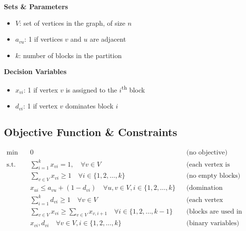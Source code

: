 \vspace{4mm}
\begin{minipage}[t]{0.48\textwidth}
\textbf{Sets \& Parameters}
\begin{itemize}[label=, noitemsep, topsep=0pt, leftmargin=2mm]
    \item $V$: set of vertices in the graph, of size $n$
    \item $a_{vu}$: 1 if vertices $v$ and $u$ are adjacent
    \item $k$: number of blocks in the partition
\end{itemize}
\end{minipage}
\hfill
\begin{minipage}[t]{0.48\textwidth}
\textbf{Decision Variables}
\begin{itemize}[label=, noitemsep, topsep=0pt, leftmargin=2mm]
    \item $x_{vi}$: 1 if vertex $v$ is assigned to the $i$\textsuperscript{th} block
    \item $d_{vi}$: 1 if vertex $v$ dominates block $i$
\end{itemize}
\end{minipage}

\subsection*{Objective Function \& Constraints}
\begin{align*}
    \min \quad &0 &&\text{(no objective)}\\
    \text{s.t.} \quad
    &\sum_{i=1}^{k} x_{vi} = 1, \quad \forall v \in V &&\text{(each vertex is assigned to one block)}\\
    &\sum_{v \in V} x_{vi} \geq 1 \quad \forall i \in \{1, 2, \dots, k\} &&\text{(no empty blocks)}\\
    &x_{ui} \leq a_{vu} + (1 - d_{vi}) \quad \forall u,v \in V, i \in \{1, 2, \dots, k\} &&\text{(domination condition)}\\
    &\sum_{i=1}^{k} d_{vi} \geq 1 \quad \forall v \in V &&\text{(each vertex dominates at least one block)}\\
    & \sum_{v \in V} x_{vi} \geq \sum_{v \in V} x_{v,i+1} \quad \forall i \in \{1, 2, \dots, k-1\} &&\text{(blocks are used in order)}\\
    &x_{vi}, d_{vi} \quad \forall v \in V, i \in \{1, 2, \dots, k\} &&\text{(binary variables)}\\
\end{align*}
